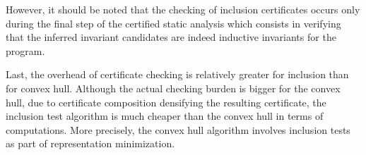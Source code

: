 However, it should be noted that the checking of inclusion certificates occurs
only during the final step of the certified static analysis which consists in
verifying that the inferred invariant candidates are indeed inductive invariants
for the program.

Last, the overhead of certificate checking is relatively greater for inclusion than for convex hull.
Although the actual checking burden is bigger for the convex hull,
due to certificate composition densifying the resulting certificate,
the inclusion test algorithm is much cheaper than the convex hull in terms of computations.
More precisely, the convex hull algorithm involves inclusion tests as part of representation minimization.

